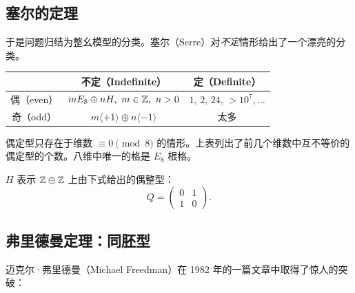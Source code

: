 
\subsection{塞尔的定理}

于是问题归结为整幺模型的分类。塞尔（Serre）对\emph{不定}情形给出了一个漂亮的分类。

\begin{center}
\renewcommand{\arraystretch}{1.25}
\begin{tabular}{|c|c|c|}
\hline
 & 不定（Indefinite） & 定（Definite）\\
\hline
偶（even） & $mE_{8}\oplus nH,\ m\in\mathbb{Z},\ n>0$ & $1,\,2,\,24,\,>10^{7},\dots$\\
\hline
奇（odd）   & $m\langle+1\rangle\oplus n\langle-1\rangle$ & 太多\\
\hline
\end{tabular}
\end{center}

偶定型只存在于维数 $\equiv 0 \pmod 8$ 的情形。上表列出了前几个维数中互不等价的
偶定型的个数。八维中唯一的格是 $E_{8}$ 根格。

$H$ 表示 $\mathbb{Z}\oplus\mathbb{Z}$ 上由下式给出的偶整型：
\begin{equation}
  Q=\begin{pmatrix}0&1\\1&0\end{pmatrix}.
  \tag{1.10}
\end{equation}


\subsection{弗里德曼定理：同胚型}

迈克尔·弗里德曼（Michael Freedman）在 1982 年的一篇文章中取得了惊人的突破：

